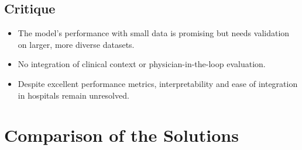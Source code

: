 \subsection*{Critique}
\begin{itemize}
    \item The model's performance with small data is promising but needs validation on larger, more diverse datasets.
    \item No integration of clinical context or physician-in-the-loop evaluation.
    \item Despite excellent performance metrics, interpretability and ease of integration in hospitals remain unresolved.
\end{itemize}


\section{Comparison of the Solutions}
